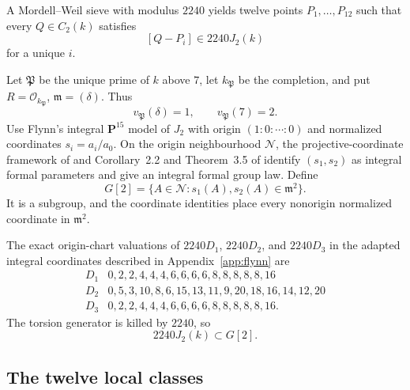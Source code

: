 \documentclass[11pt]{article}
\newcommand{\OO}{\mathcal O}
\newcommand{\m}{\mathfrak m}
\newcommand{\PP}{\mathfrak P}
\theoremstyle{definition}
\theoremstyle{remark}
\begin{document}
A Mordell--Weil sieve \cite{BruinStollSieve} with modulus $2240$ yields
twelve points
$P_1,\ldots,P_{12}$ such that every $Q\in C_2(k)$ satisfies
\begin{equation}\label{eq:section7-sieve}
            [Q-P_i]\in2240J_2(k)
\end{equation}
for a unique $i$.

Let $\PP$ be the unique prime of $k$ above $7$, let
$k_\PP$ be the completion, and put $R=\OO_{k_\PP}$, $\m=(\delta)$.  Thus
\[
                         v_\PP(\delta)=1,\qquad v_\PP(7)=2.
\]
Use Flynn's integral $\mathbf P^{15}$ model of $J_2$ with origin
$(1:0:\cdots:0)$ and normalized coordinates $s_i=a_i/a_0$.  On the
origin neighbourhood $\mathcal N$, the projective-coordinate framework of
\cite{CasselsFlynn} and Corollary~2.2 and Theorem~3.5 of \cite{Flynn}
identify $(s_1,s_2)$ as integral formal parameters and give an
integral formal group law.  Define
\begin{equation}\label{eq:G2}
 G[2]=\{A\in\mathcal N:s_1(A),s_2(A)\in\m^2\}.
\end{equation}
It is a subgroup, and the coordinate identities place every nonorigin
normalized coordinate in $\m^2$.

The exact origin-chart valuations of $2240D_1$, $2240D_2$, and $2240D_3$
in the adapted integral coordinates described in Appendix~\ref{app:flynn}
are
\begin{equation}\label{eq:section7-valuations}
\begin{array}{c|l}
D_1&0,2,2,4,4,4,6,6,6,6,8,8,8,8,8,16\\
D_2&0,5,3,10,8,6,15,13,11,9,20,18,16,14,12,20\\
D_3&0,2,2,4,4,4,6,6,6,6,8,8,8,8,8,16.
\end{array}
\end{equation}
The torsion generator is killed by $2240$, so
\begin{equation}\label{eq:2240G2}
                            2240J_2(k)\subset G[2].
\end{equation}

\subsection{The twelve local classes}
\end{document}
